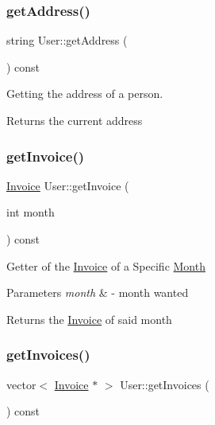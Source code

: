 \subsubsection{\texorpdfstring{get\+Address()}{getAddress()}}
{\footnotesize\ttfamily string User\+::get\+Address (\begin{DoxyParamCaption}{ }\end{DoxyParamCaption}) const}



Getting the address of a person. 

\begin{DoxyReturn}{Returns}
the current address 
\end{DoxyReturn}
\mbox{\label{class_user_a82cb8a4c8f92d2a31fb2e8b0cff001f6}} 
\subsubsection{\texorpdfstring{get\+Invoice()}{getInvoice()}}
{\footnotesize\ttfamily \mbox{\hyperlink{class_invoice}{Invoice}} User\+::get\+Invoice (\begin{DoxyParamCaption}\item[{int}]{month }\end{DoxyParamCaption}) const}

Getter of the \mbox{\hyperlink{class_invoice}{Invoice}} of a Specific \mbox{\hyperlink{class_month}{Month}} 
\begin{DoxyParams}{Parameters}
{\em month} & -\/ month wanted \\
\hline
\end{DoxyParams}
\begin{DoxyReturn}{Returns}
the \mbox{\hyperlink{class_invoice}{Invoice}} of said month 
\end{DoxyReturn}
\mbox{\label{class_user_ab633b50f8af608b0058c66fa5ced8494}} 
\subsubsection{\texorpdfstring{get\+Invoices()}{getInvoices()}}
{\footnotesize\ttfamily vector$<$ \mbox{\hyperlink{class_invoice}{Invoice}} $\ast$ $>$ User\+::get\+Invoices (\begin{DoxyParamCaption}{ }\end{DoxyParamCaption}) const}



